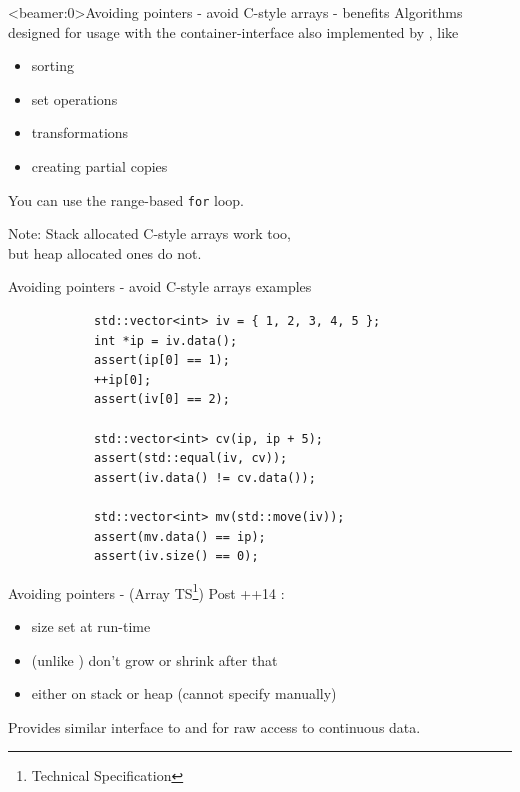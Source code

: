 	\begin{frame}<beamer:0>{Avoiding pointers - avoid C-style arrays - benefits}
		Algorithms designed for usage with the container-interface also implemented by , like
		\begin{itemize}
			\item sorting
			\item set operations
			\item transformations
			\item creating partial copies
		\end{itemize}
		
		\emptyline
		You can use the range-based \lstinline|for| loop.
		
		Note: Stack allocated C-style arrays work too, \\
		but heap allocated ones do not.
	\end{frame}
	
	\begin{frame}[fragile=singleslide]{Avoiding pointers - avoid C-style arrays examples}
		\begin{lstlisting}
			std::vector<int> iv = { 1, 2, 3, 4, 5 };
			int *ip = iv.data();
			assert(ip[0] == 1);
			++ip[0];
			assert(iv[0] == 2);
			
			std::vector<int> cv(ip, ip + 5);
			assert(std::equal(iv, cv));
			assert(iv.data() != cv.data());
			
			std::vector<int> mv(std::move(iv));
			assert(mv.data() == ip);
			assert(iv.size() == 0);
		\end{lstlisting}
	\end{frame}
	
	\begin{frame}{Avoiding pointers - (Array TS\footnote{Technical Specification}) }
		Post \C++14 :
		\begin{itemize}
			\item size set at run-time
			\item (unlike ) don't grow or shrink after that
			\item either on stack or heap (cannot specify manually)
		\end{itemize}
		
		Provides similar interface to  and  for raw access to continuous data.
	\end{frame}
	
